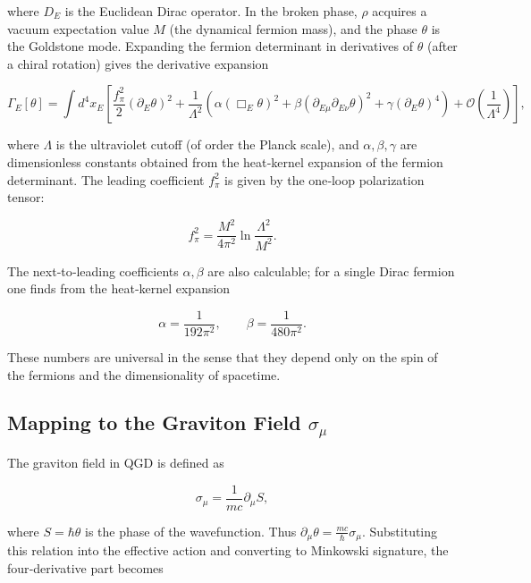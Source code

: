 \documentclass[11pt,a4paper]{article}
\begin{document}
where \(D_E\) is the Euclidean Dirac operator. In the broken phase, \(\rho\) acquires a vacuum expectation value \(M\) (the dynamical fermion mass), and the phase \(\theta\) is the Goldstone mode. Expanding the fermion determinant in derivatives of \(\theta\) (after a chiral rotation) gives the derivative expansion

\begin{equation}
\Gamma_E[\theta] = \int d^4x_E \left[ \frac{f_\pi^2}{2} (\partial_E\theta)^2 + \frac{1}{\Lambda^2} \left( \alpha (\Box_E\theta)^2 + \beta (\partial_{E\mu}\partial_{E\nu}\theta)^2 + \gamma (\partial_E\theta)^4 \right) + \mathcal{O}\left(\frac{1}{\Lambda^4}\right) \right],
\end{equation}

where \(\Lambda\) is the ultraviolet cutoff (of order the Planck scale), and \(\alpha,\beta,\gamma\) are dimensionless constants obtained from the heat‑kernel expansion of the fermion determinant. The leading coefficient \(f_\pi^2\) is given by the one‑loop polarization tensor:

\begin{equation}
f_\pi^2 = \frac{M^2}{4\pi^2} \ln\frac{\Lambda^2}{M^2}. \label{eq:fpi}
\end{equation}

The next‑to‑leading coefficients \(\alpha,\beta\) are also calculable; for a single Dirac fermion one finds from the heat‑kernel expansion

\begin{equation}
\alpha = \frac{1}{192\pi^2}, \qquad \beta = \frac{1}{480\pi^2}. \label{eq:alpha}
\end{equation}

These numbers are universal in the sense that they depend only on the spin of the fermions and the dimensionality of spacetime.

\subsection{Mapping to the Graviton Field \(\sigma_\mu\)}

The graviton field in QGD is defined as

\begin{equation}
\sigma_\mu = \frac{1}{mc}\partial_\mu S,
\end{equation}

where \(S = \hbar\theta\) is the phase of the wavefunction. Thus \(\partial_\mu\theta = \frac{mc}{\hbar}\sigma_\mu\). Substituting this relation into the effective action and converting to Minkowski signature, the four‑derivative part becomes
\end{document}
